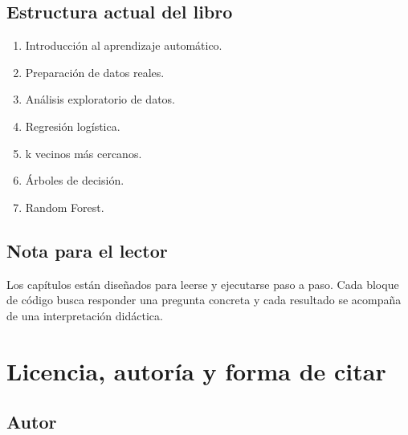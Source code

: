 \documentclass[
  spanish,
  11pt,
  letterpaper,
]{book}
\providecommand{\tightlist}{%
  \setlength{\itemsep}{0pt}\setlength{\parskip}{0pt}}
\begin{document}
\section*{Estructura actual del
libro}\label{estructura-actual-del-libro}


\begin{enumerate}
\def\labelenumi{\arabic{enumi}.}
\tightlist
\item
  Introducción al aprendizaje automático.
\item
  Preparación de datos reales.
\item
  Análisis exploratorio de datos.
\item
  Regresión logística.
\item
  k vecinos más cercanos.
\item
  Árboles de decisión.
\item
  Random Forest.
\end{enumerate}

\section*{Nota para el lector}\label{nota-para-el-lector}


Los capítulos están diseñados para leerse y ejecutarse paso a paso. Cada
bloque de código busca responder una pregunta concreta y cada resultado
se acompaña de una interpretación didáctica.


\chapter*{Licencia, autoría y forma de
citar}\label{licencia-autoruxeda-y-forma-de-citar}


\section*{Autor}\label{autor}

\end{document}
